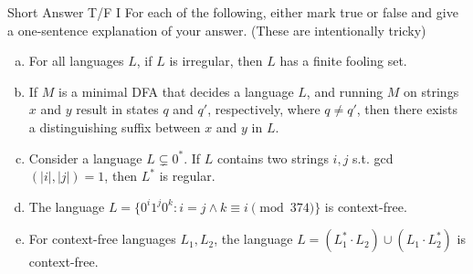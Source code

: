 \documentclass{beamer}
\begin{document}

\begin{frame}[t]{Short Answer T/F I}
    For each of the following, either mark true or false and give a one-sentence explanation of your answer. (These are intentionally tricky)
     \vspace{.5cm}
    \begin{enumerate}[(a)]
        \item For all languages $L$, if $L$ is irregular, then $L$ has a finite fooling set.
        \vspace{1cm}
        \item If $M$ is a minimal DFA that decides a language $L$, and running $M$ on strings $x$ and $y$ result in states $q$ and $q'$, respectively, where $q \neq q'$, then there exists a distinguishing suffix between $x$ and $y$ in $L$.
         \vspace{1cm}
        \item Consider a language $L \subsetneq 0^*$. If $L$ contains two strings $i, j$ s.t. gcd$(|i|, |j|) = 1$, then $L^*$ is regular.
         \vspace{1cm}
        \item The language $L = \{0^i 1^j 0^k: i = j \wedge k \equiv i \pmod{374}\}$ is context-free.
         \vspace{1cm}
        \item For context-free languages $L_1, L_2$, the language $L = (L_1^* \cdot L_2) \cup (L_1 \cdot L_2^*)$ is context-free.
    \end{enumerate}
\end{frame}
\end{document}
